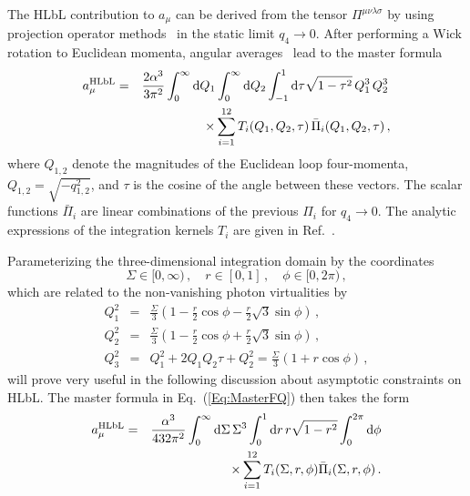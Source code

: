 The HLbL contribution to $a_\mu$ can be derived from the tensor $\Pi^{\mu\nu\lambda\sigma}$ by using projection operator methods~\cite{Aldins:1970id,Barbieri:1974nc,Jegerlehner:2008zza} in the static limit $q_4 \to 0$. After performing a Wick rotation to Euclidean momenta, angular averages~\cite{Rosner:1967zz, Levine:1974xh} lead to the master formula~\cite{BTT3}
\begin{eqnarray}
a_\mu^\text{HLbL} & = & \frac{2\alpha^3}{3\pi^2}\int_{0}^{\infty} \mathop{}\!\mathrm{d} Q_1 \int_{0}^{\infty} \mathop{}\!\mathrm{d} Q_2 \int_{-1}^{1} \mathop{}\!\mathrm{d} \tau \sqrt{1-\tau^2}\,Q_1^3\, Q_2^3\,\nonumber\\
&& \times \sum_{i=1}^{12} T_i(Q_1,Q_2,\tau) \,\bar{\Pi}_i(Q_1,Q_2,\tau)\,,
\label{Eq:MasterFQ}
\end{eqnarray}
where $Q_{1,2}$ denote the magnitudes of the Euclidean loop four-momenta, $Q_{1,2} = \sqrt{-q_{1,2}^2}$, and $\tau$ is the cosine of the angle between these vectors. The scalar functions $\bar{\Pi}_i$ are linear combinations of the previous $\Pi_i$ for $q_4 \to 0$. The analytic expressions of the integration kernels $T_i$ are given in Ref.~\cite{BTT3}.

Parameterizing the three-dimensional integration domain by the coordinates \cite{EichmannParametrization}
\begin{equation}
\Sigma \in [0,\infty)\,,\quad r \in [0,1]\,,\quad \phi \in [0,2\pi)\, ,
\end{equation}
which are related to the non-vanishing photon virtualities by
\begin{eqnarray}
Q_1^2 & = & \frac{\Sigma}{3}\left(1 - \frac{r}{2} \cos\phi - \frac{r}{2} \sqrt{3}\sin \phi\right)\,, \nonumber \\
Q_2^2 & = & \frac{\Sigma}{3}\left(1 - \frac{r}{2} \cos\phi + \frac{r}{2} \sqrt{3}\sin \phi\right)\,, \nonumber \\
Q_3^2 & = & Q_1^2 + 2 Q_1 Q_2 \tau + Q_2^2 = \frac{\Sigma}{3}\left(1 + r \cos\phi\right)\,,
\end{eqnarray}
will prove very useful in the following discussion about asymptotic constraints on HLbL. The master formula in Eq.~(\ref{Eq:MasterFQ}) then takes the form
\begin{eqnarray}
a_\mu^\text{HLbL} & = & \frac{\alpha^3}{432\pi^2}\int_{0}^{\infty} \mathop{}\!\mathrm{d} \Sigma \,\Sigma^3 \int_{0}^{1} \mathop{}\!\mathrm{d} r\, r\sqrt{1-r^2} \int_{0}^{2\pi} \mathop{}\!\mathrm{d} \phi \nonumber\\
&& \times\sum_{i=1}^{12} T_i(\Sigma,r,\phi) \bar{\Pi}_i(\Sigma,r,\phi)\, .
\end{eqnarray}

